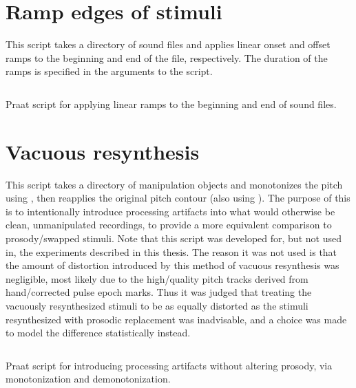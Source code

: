 \section{Ramp edges of stimuli}
This script takes a directory of sound files and applies linear onset and offset ramps to the beginning and end of the file, respectively.  The duration of the ramps is specified in the arguments to the script. 
\begin{code}
	\inputminted[fontsize=\footnotesize, tabsize=2]{r}{../scripts/dissversions/RampEdges_DissVersion.praat}
	\caption[Ramp edges of stimuli]{Praat script for applying linear ramps to the beginning and end of sound files.\label{lst:RampEdges}}
\end{code}
\newpage

\section{Vacuous resynthesis}
This script takes a directory of manipulation objects and monotonizes the pitch using \psola, then reapplies the original pitch contour (also using \psola).  The purpose of this is to intentionally introduce processing artifacts into what would otherwise be clean, unmanipulated recordings, to provide a more equivalent comparison to prosody\-/swapped stimuli.  Note that this script was developed for, but not used in, the experiments described in this thesis.  The reason it was not used is that the amount of distortion introduced by this method of vacuous resynthesis was negligible, most likely due to the high\-/quality pitch tracks derived from hand\-/corrected pulse epoch marks.  Thus it was judged that treating the vacuously resynthesized stimuli to be as equally distorted as the stimuli resynthesized with prosodic replacement was inadvisable, and a choice was made to model the difference statistically instead.  
\begin{code}
	\inputminted[fontsize=\footnotesize, tabsize=2]{r}{../scripts/dissversions/VacuousResynthesis_DissVersion.praat}
	\caption[Vacuous resynthesis]{Praat script for introducing processing artifacts without altering prosody, via monotonization and demonotonization.\label{lst:VacResynth}}
\end{code}
